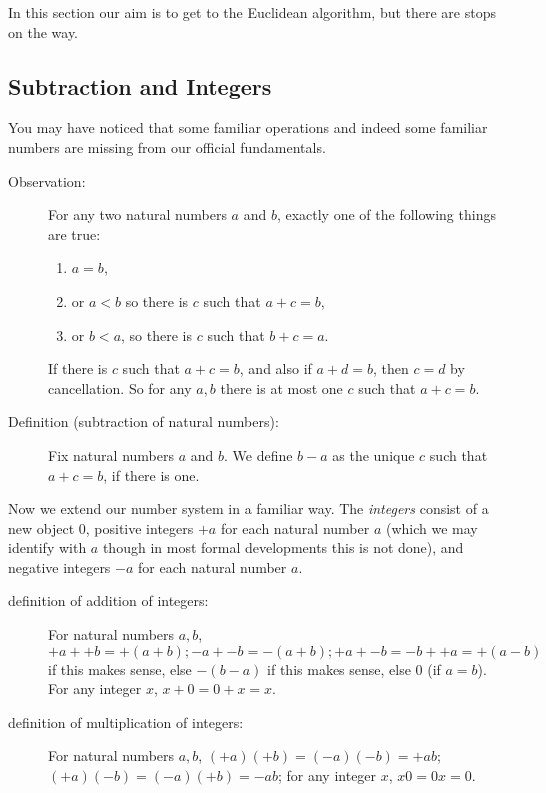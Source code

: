 \documentclass[12pt]{article}
\begin{document}
In this section our aim is to get to the Euclidean algorithm, but there are stops on the way.

\subsection{Subtraction and Integers}

You may have noticed that some familiar operations and indeed some familiar numbers are missing from our official fundamentals.

\begin{description}

\item[Observation:]   For any two natural numbers $a$ and $b$, exactly one of the following things are true:

\begin{enumerate}

\item $a=b$, 

\item or $a<b$ so there is $c$ such that $a+c=b$, 

\item or $b<a$, so there is $c$ such that $b+c=a$.

\end{enumerate}


If there is $c$ such that $a+c=b$, and also if $a+d=b$, then $c=d$ by cancellation.   So for any $a,b$ there is at most one $c$ such that $a+c=b$.

\item[Definition (subtraction of natural numbers):]  Fix natural numbers $a$ and $b$.   We define $b-a$ as the unique $c$ such that $a+c=b$, if there is one.

\end{description}

Now we extend our number system in a familiar way.  The {\em integers} consist of a new object 0,
positive integers $+a$ for each natural number $a$ (which we may identify with $a$ though in most formal developments this is not done), and negative integers $-a$ for each natural number $a$.

\begin{description}

\item[definition of addition  of integers:]  For natural numbers $a,b$, $+a + +b = +(a+b); -a + -b = -(a+b); +a + -b = -b+ +a = +(a-b)$ if this makes sense,
else $-(b-a)$ if this makes sense, else 0 (if $a=b$).  For any integer $x$, $x+0=0+x=x$.

\item[definition of multiplication  of integers:]  For natural numbers $a,b$, $(+a)(+b) = (-a)(-b) = +ab$; $(+a)(-b)=(-a)(+b)=-ab$;  for any integer $x$, $x0=0x=0$.

\end{description}
\end{document}

